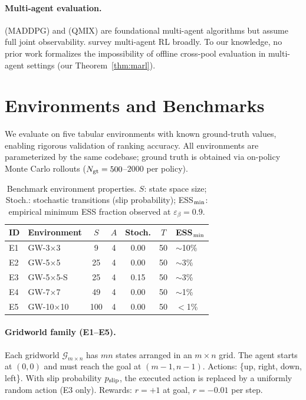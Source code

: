 \documentclass[10pt]{article}
\theoremstyle{plain}
\theoremstyle{definition}
\theoremstyle{remark}
\begin{document}
\paragraph{Multi-agent evaluation.}
\citet{lowe2017multiagent} (MADDPG) and \citet{rashid2018qmix} (QMIX) are
foundational multi-agent algorithms but assume full joint observability.
\citet{hernandez2019survey} survey multi-agent RL broadly.  To our knowledge,
no prior work formalizes the impossibility of offline cross-pool evaluation
in multi-agent settings (our Theorem~\ref{thm:marl}).

\section{Environments and Benchmarks}
\label{sec:envs}

We evaluate on five tabular environments with known ground-truth values,
enabling rigorous validation of ranking accuracy.  All environments are
parameterized by the same codebase; ground truth is obtained via on-policy
Monte Carlo rollouts ($N_{\rm gt}=500$--$2000$ per policy).

\begin{table}[t]
  \centering
  \small
  \caption{Benchmark environment properties.  $S$: state space size;
    Stoch.: stochastic transitions (slip probability);
    ESS$_{\rm min}$: empirical minimum ESS fraction observed at $\varepsilon_\beta=0.9$.}
  \label{tab:envs}
  \begin{tabular}{llccccl}
    \toprule
    ID & Environment & $S$ & $A$ & Stoch. & $T$ & ESS$_{\rm min}$ \\
    \midrule
    E1 & GW-3$\times$3   &  9 & 4 & 0.00 & 50 & $\sim$10\% \\
    E2 & GW-5$\times$5   & 25 & 4 & 0.00 & 50 & $\sim$3\%  \\
    E3 & GW-5$\times$5-S & 25 & 4 & 0.15 & 50 & $\sim$3\%  \\
    E4 & GW-7$\times$7   & 49 & 4 & 0.00 & 50 & $\sim$1\%  \\
    E5 & GW-10$\times$10 & 100 & 4 & 0.00 & 50 & $<$1\%     \\
    \bottomrule
  \end{tabular}
\end{table}

\paragraph{Gridworld family (E1--E5).}
Each gridworld $\mathcal{G}_{m\times n}$ has $mn$ states arranged in an
$m{\times}n$ grid.  The agent starts at $(0,0)$ and must reach the goal at
$(m{-}1,n{-}1)$.  Actions: \{up, right, down, left\}.  With slip probability
$p_{\rm slip}$, the executed action is replaced by a uniformly random action
(E3 only).  Rewards: $r=+1$ at goal, $r=-0.01$ per step.
\end{document}
